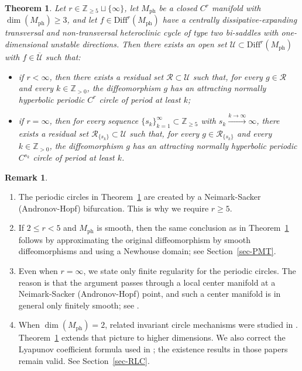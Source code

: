 \documentclass[11pt,a4paper]{article}
\theoremstyle{plain}
\theoremstyle{definition}
\newtheorem{remark}[theorem]{Remark}
\theoremstyle{plain}
\newtheorem{maintheorem}{Theorem}
\numberwithin{equation}{section}
\begin{document}
\begin{maintheorem}
\label{thm-main}
Let $r \in \mathbb{Z}_{\ge 5} \sqcup \{\infty\}$, let $M_\mathrm{ph}$ be a closed $C^r$ manifold with $\dim(M_\mathrm{ph}) \ge 3$, and let $f \in \mathrm{Diff}^r(M_\mathrm{ph})$ have a centrally dissipative-expanding transversal and non-transversal heteroclinic cycle of type two bi-saddles with one-dimensional unstable directions. Then there exists an open set $\mathcal{U} \subset \mathrm{Diff}^r(M_\mathrm{ph})$ with $f \in \overline{\mathcal{U}}$ such that:
\begin{itemize}
\item if $r < \infty$, then there exists a residual set $\mathcal{R} \subset \mathcal{U}$ such that, for every $g \in \mathcal{R}$ and every $k \in \mathbb{Z}_{>0}$, the diffeomorphism $g$ has an attracting normally hyperbolic periodic $C^r$ circle of period at least $k$;
\item if $r = \infty$, then for every sequence $\{s_k\}_{k=1}^\infty \subset \mathbb{Z}_{\ge 5}$ with $s_k \xrightarrow{k \to \infty} \infty$, there exists a residual set $\mathcal{R}_{\{s_k\}} \subset \mathcal{U}$ such that, for every $g \in \mathcal{R}_{\{s_k\}}$ and every $k \in \mathbb{Z}_{>0}$, the diffeomorphism $g$ has an attracting normally hyperbolic periodic $C^{s_k}$ circle of period at least $k$.
\end{itemize}
\end{maintheorem}

\begin{remark}\leavevmode
\label{rem-LCinc}
\begin{enumerate}
\item[(1)] The periodic circles in Theorem~\ref{thm-main} are created by a Neimark-Sacker (Andronov-Hopf) bifurcation. This is why we require $r \ge 5$.
\item[(2)] If $2 \le r < 5$ and $M_\mathrm{ph}$ is smooth, then the same conclusion as in Theorem~\ref{thm-main} follows by approximating the original diffeomorphism by smooth diffeomorphisms and using a Newhouse domain; see Section~\ref{sec-PMT}.
\item[(3)] Even when $r = \infty$, we state only finite regularity for the periodic circles. The reason is that the argument passes through a local center manifold at a Neimark-Sacker (Andronov-Hopf) point, and such a center manifold is in general only finitely smooth; see \cite[Section~5.10.2]{Robinson1999}.
\item[(4)] When $\dim(M_\mathrm{ph}) = 2$, related invariant circle mechanisms were studied in \cite{GSS2002,GSS2006}. Theorem~\ref{thm-main} extends that picture to higher dimensions. We also correct the Lyapunov coefficient formula used in \cite[Equation~(30)]{GSS2002}; the existence results in those papers remain valid. See Section~\ref{sec-RLC}.
\end{enumerate}
\end{remark}
\end{document}
